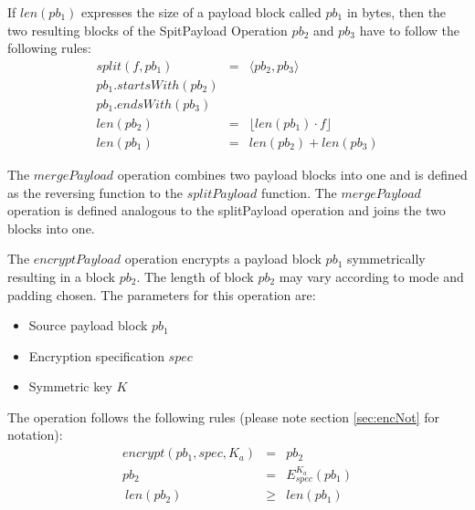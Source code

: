 \documentclass[acmsmall, screen]{acmart}
\begin{document}
If $len(pb_1)$ expresses the size of a payload block called $pb_1$ in bytes, then the two resulting blocks of the SpitPayload Operation $pb_2$ and $pb_3$ have to follow the following rules:
\begin{eqnarray}
split(f, pb_1) & = &\langle pb_2, pb_3 \rangle\\
pb_1.startsWith(pb_2)\\
pb_1.endsWith(pb_3)\\
len(pb_2) & = & \lfloor len(pb_1)\cdot f\rfloor\\
len(pb_1) & = & len(pb_2) + len(pb_3)
\end{eqnarray}

The $mergePayload$ operation combines two payload blocks into one and is defined as the reversing function to the $splitPayload$ function. 
%
%
%
The $mergePayload$ operation is defined analogous to the splitPayload operation and joins the two blocks into one.
%

The $encryptPayload$ operation encrypts a payload block $pb_1$ symmetrically resulting in a block $pb_2$. The length of block $pb_2$ may vary according to mode and padding chosen. The parameters for this operation are:
\begin{itemize}
	\item Source payload block $pb_1$
	\item Encryption specification $spec$
	\item Symmetric key $K$
\end{itemize}

The operation follows the following rules (please note section \ref{sec:encNot} for notation):
\begin{eqnarray}
encrypt(pb_1, spec, K_a) & = & pb_2 \\
pb_2 & = & E_{spec}^{K_a}\left( pb_1 \right)\\\
len(pb_2) & \geq & len(pb_1)
\end{eqnarray}
\end{document}

